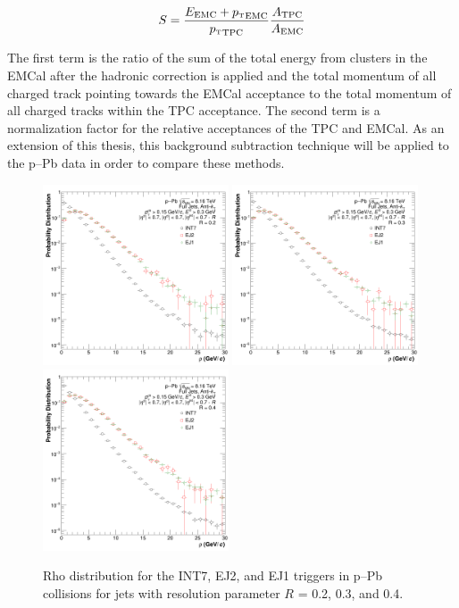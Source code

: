 \documentclass[ALICE]{ALICE_analysis_notes}
\newcommand{\pT}{$p_{\mbox{\tiny T}}$\xspace}
\newcommand{\pPb}{{\mbox{p--Pb}}\xspace}
\begin{document}
\begin{equation}
    S = \frac{E_{\text{EMC}}+\text{\pT}_\text{EMC}}{\text{\pT}_\text{TPC}}\frac{A_{\text{TPC}}}{A_{\text{EMC}}}
\end{equation}

\noindent
The first term is the ratio of the sum of the total energy from clusters in the EMCal after the hadronic correction is applied and the total momentum of all charged track pointing towards the EMCal acceptance to the total momentum of all charged tracks within the TPC acceptance. The second term is a normalization factor for the relative acceptances of the TPC and EMCal. As an extension of this thesis, this background subtraction technique will be applied to the \pPb data in order to compare these methods.

\begin{figure}[hbt!]
  \centering
  \includegraphics[width=0.49\textwidth]{figures/pPbFigures/BGSubtraction/plotRho_R02.png}
  \includegraphics[width=0.49\textwidth]{figures/pPbFigures/BGSubtraction/plotRho_R03.png}
  \includegraphics[width=0.49\textwidth]{figures/pPbFigures/BGSubtraction/plotRho_R04.png}
  \caption{Rho distribution for the INT7, EJ2, and EJ1 triggers in \pPb collisions for jets with resolution parameter $R$ = 0.2, 0.3, and 0.4.}
  \label{fig:Rho_distribution}
\end{figure}
\end{document}
